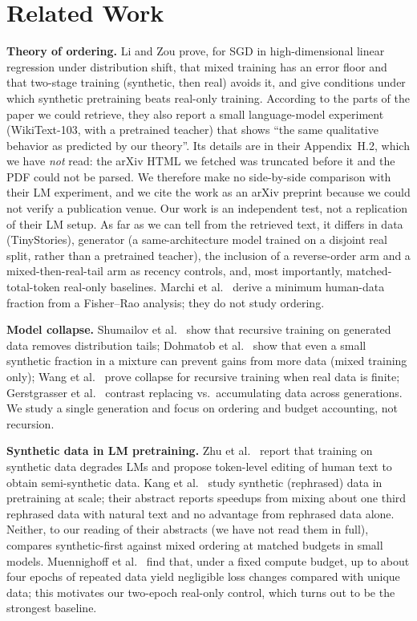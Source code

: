 \documentclass[conference]{IEEEtran}
\begin{document}
\section{Related Work}
\textbf{Theory of ordering.} Li and Zou \cite{li2026synthetic} prove, for SGD in high-dimensional linear regression under distribution shift, that mixed training has an error floor and that two-stage training (synthetic, then real) avoids it, and give conditions under which synthetic pretraining beats real-only training. According to the parts of the paper we could retrieve, they also report a small language-model experiment (WikiText-103, with a pretrained teacher) that shows ``the same qualitative behavior as predicted by our theory''. Its details are in their Appendix~H.2, which we have \emph{not} read: the arXiv HTML we fetched was truncated before it and the PDF could not be parsed. We therefore make no side-by-side comparison with their LM experiment, and we cite the work as an arXiv preprint because we could not verify a publication venue. Our work is an independent test, not a replication of their LM setup. As far as we can tell from the retrieved text, it differs in data (TinyStories), generator (a same-architecture model trained on a disjoint real split, rather than a pretrained teacher), the inclusion of a reverse-order arm and a mixed-then-real-tail arm as recency controls, and, most importantly, matched-total-token real-only baselines. Marchi et al.\ \cite{marchi2026fisher} derive a minimum human-data fraction from a Fisher--Rao analysis; they do not study ordering.

\textbf{Model collapse.} Shumailov et al.\ \cite{shumailov2023curse} show that recursive training on generated data removes distribution tails; Dohmatob et al.\ \cite{dohmatob2024strong} show that even a small synthetic fraction in a mixture can prevent gains from more data (mixed training only); Wang et al.\ \cite{wang2024finite} prove collapse for recursive training when real data is finite; Gerstgrasser et al.\ \cite{gerstgrasser2024collapse} contrast replacing vs.\ accumulating data across generations. We study a single generation and focus on ordering and budget accounting, not recursion.

\textbf{Synthetic data in LM pretraining.} Zhu et al.\ \cite{zhu2025synthesize} report that training on synthetic data degrades LMs and propose token-level editing of human text to obtain semi-synthetic data. Kang et al.\ \cite{kang2025demystifying} study synthetic (rephrased) data in pretraining at scale; their abstract reports speedups from mixing about one third rephrased data with natural text and no advantage from rephrased data alone. Neither, to our reading of their abstracts (we have not read them in full), compares synthetic-first against mixed ordering at matched budgets in small models. Muennighoff et al.\ \cite{muennighoff2023scaling} find that, under a fixed compute budget, up to about four epochs of repeated data yield negligible loss changes compared with unique data; this motivates our two-epoch real-only control, which turns out to be the strongest baseline.
\end{document}
